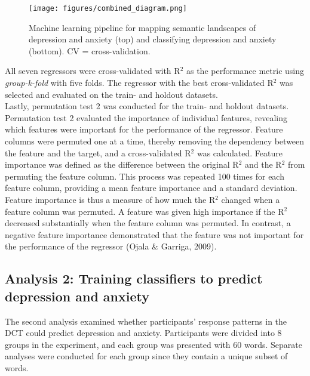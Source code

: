 \documentclass[11pt, a4paper]{article}
\begin{document}
\begin{figure}
\centering
\texttt{[image: figures/combined\_diagram.png]}
\caption{\label{fig:data} Machine learning pipeline for mapping semantic landscapes of depression and anxiety (top) and classifying depression and anxiety (bottom). CV = cross-validation.}
\end{figure}

All seven regressors were cross-validated with R$^2$ as the performance metric using \textit{group-k-fold} with five folds. The regressor with the best cross-validated R$^2$ was selected and evaluated on the train- and holdout datasets. \\

Lastly, permutation test 2 was conducted for the train- and holdout datasets. Permutation test 2 evaluated the importance of individual features, revealing which features were important for the performance of the regressor. Feature columns were permuted one at a time, thereby removing the dependency between the feature and the target, and a cross-validated R$^2$ was calculated. Feature importance was defined as the difference between the original R$^2$ and the R$^2$ from permuting the feature column. This process was repeated 100 times for each feature column, providing a mean feature importance and a standard deviation. Feature importance is thus a measure of how much the R$^2$ changed when a feature column was permuted. A feature was given high importance if the R$^2$ decreased substantially when the feature column was permuted. In contrast, a negative feature importance demonstrated that the feature was not important for the performance of the regressor (Ojala \& Garriga, 2009).


\subsection{Analysis 2: Training classifiers to predict depression and anxiety}
The second analysis examined whether participants’ response patterns in the DCT could predict depression and anxiety. Participants were divided into 8 groups in the experiment, and each group was presented with 60 words. Separate analyses were conducted for each group since they contain a unique subset of words.\\
\end{document}
